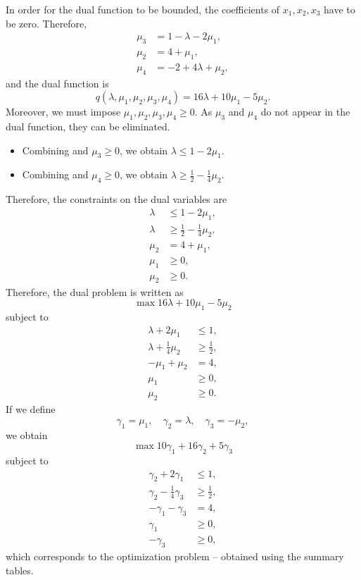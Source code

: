 In order for the dual function to be bounded, the coefficients of
$x_1,x_2,x_3$ have to be zero. Therefore,
\begin{align}
  \mu_3& =1-\lambda-2\mu_1, \label{eq:mu3}\\
  \mu_2&= 4 +\mu_1, \\
  \mu_4 &= -2+4\lambda+\mu_2, \label{eq:mu4}
\end{align}
and the dual function is
\[
q(\lambda, \mu_1, \mu_2, \mu_3, \mu_4) =  16\lambda +10\mu_1 -5\mu_2.
\]
Moreover, we must impose $\mu_1, \mu_2, \mu_3,\mu_4 \geq 0$.
As $\mu_3$ and $\mu_4$ do not appear in the dual function, they can
be eliminated.
\begin{itemize}
\item Combining  and $\mu_3 \geq 0$, we obtain $\lambda \leq 1-2\mu_1$.
\item Combining  and $\mu_4 \geq 0$, we obtain $\lambda \geq \frac{1}{2}-\frac{1}{4}\mu_2$.
\end{itemize}
Therefore, the constraints on the dual variables are
\begin{align*}
  \lambda &\leq 1-2\mu_1, \\
  \lambda &\geq \frac{1}{2}-\frac{1}{4}\mu_2, \\
  \mu_2&= 4 +\mu_1, \\
  \mu_1 & \geq 0, \\
  \mu_2 & \geq 0.
\end{align*}
Therefore, the dual problem is written as $$ \max 16\lambda +10\mu_1 -5\mu_2$$ subject to
\begin{align*}
\lambda+2\mu_1 & \leq 1,\\
\lambda + \frac{1}{4}\mu_2 & \geq  \frac{1}{2},\\
-\mu_1+\mu_2 & = 4,\\
\mu_1 & \geq 0, \\
\mu_2 & \geq 0.
\end{align*}
If we define $$\gamma_1=\mu_1, \quad \gamma_2=\lambda, \quad \gamma_3=-\mu_2,$$ we obtain
\[
\max   10\gamma_1 + 16\gamma_2 + 5\gamma_3 
\]
subject to
\begin{align*}
\gamma_2+2\gamma_1 & \leq 1,\\
\gamma_2 - \frac{1}{4}\gamma_3 & \geq  \frac{1}{2},\\
-\gamma_1-\gamma_3 & = 4,\\
\gamma_1 & \geq 0, \\
-\gamma_3 & \geq 0,
\end{align*}
which corresponds to the optimization problem
-- obtained using the summary tables.

